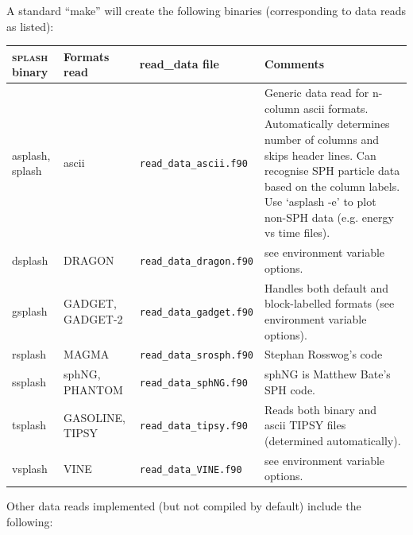\documentclass[a4paper,10pt]{article}
\newcommand{\splash}{\textsc{splash }}
\begin{document}
A standard ``make'' will create the following binaries (corresponding to data reads as listed):

\begin{table}[h!]
\begin{tabular}{lllp{}}
\splash binary & Formats read & read\_data file & Comments \\
\hline
asplash, splash & ascii & \verb+read_data_ascii.f90+ & Generic data read for n-column ascii formats. Automatically determines number of columns and skips header lines. Can recognise SPH particle data based on the column labels. Use `asplash -e' to plot non-SPH data (e.g. energy vs time files).\\
dsplash & DRAGON & \verb+read_data_dragon.f90+ & see environment variable options. \\
gsplash & GADGET, GADGET-2 &  \verb+read_data_gadget.f90+ & Handles both default and block-labelled formats (see environment variable options). \\
rsplash & MAGMA & \verb+read_data_srosph.f90+  & Stephan Rosswog's code \\
ssplash & sphNG, PHANTOM & \verb+read_data_sphNG.f90+ & sphNG is Matthew Bate's SPH code. \\
tsplash & GASOLINE, TIPSY  &  \verb+read_data_tipsy.f90+ & Reads both binary and ascii TIPSY files (determined automatically). \\
vsplash & VINE & \verb+read_data_VINE.f90+ & see environment variable options. \\
\hline
\end{tabular} 
\end{table}

Other data reads implemented (but not compiled by default) include the following:
\end{document}
